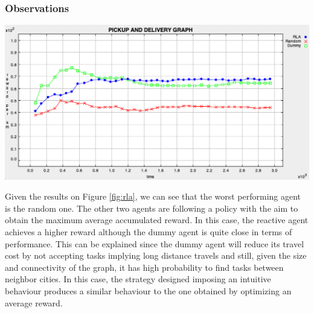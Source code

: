 \documentclass[11pt]{article}
\begin{document}
\subsubsection{Observations}
\begin{minipage}[]{\textwidth}

\begin{minipage}[]{0.48\textwidth}
\includegraphics[width=\textwidth]{2-reactive/doc/plots/rla-dummy.png}
\label{fig:rla}
\end{minipage}
\hfill
\begin{minipage}[]{0.5\textwidth}
Given the results on Figure \ref{fig:rla}, we can see that the worst performing agent is the random one. The other two agents are following a policy with the aim to obtain the maximum average accumulated reward. In this case, the reactive agent achieves a higher reward although the dummy agent is quite close in terms of performance. This can be explained since the dummy agent will reduce its travel cost by not accepting tasks implying long distance travels and still, given the size and connectivity of the graph, it has high probability to find tasks between neighbor cities. In this case, the strategy designed imposing an intuitive behaviour produces a similar behaviour to the one obtained by optimizing an average reward. 
\end{minipage}

\end{minipage}
\end{document}

